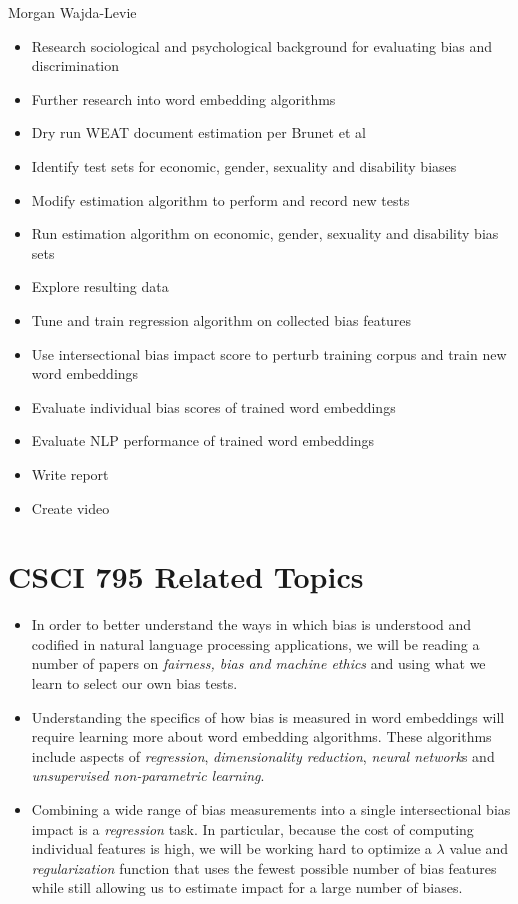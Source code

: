 \documentclass{article}
\begin{document}
\vspace{1em}
\noindent
Morgan Wajda-Levie
\begin{itemize}
    \item Research sociological and psychological background for
        evaluating bias and discrimination
    \item Further research into word embedding algorithms
    \item Dry run WEAT document estimation per Brunet et
        al\cite{brunet_understanding_2019}
    \item Identify test sets for economic, gender, sexuality and
        disability biases
    \item Modify estimation algorithm to perform and record new tests
    \item Run estimation algorithm on economic, gender, sexuality and
        disability bias sets
    \item Explore resulting data
    \item Tune and train regression algorithm on collected bias features
    \item Use intersectional bias impact score to perturb training
        corpus and train new word embeddings
    \item Evaluate individual bias scores of trained word embeddings
    \item Evaluate NLP performance of trained word embeddings
    \item Write report
    \item Create video
\end{itemize}

\section{CSCI 795 Related Topics}

\begin{itemize}
    \item In order to better understand the ways in which bias is
        understood and codified in natural language processing
        applications, we will be reading a number of papers on
        \emph{fairness, bias and machine ethics} and using what we learn
        to select our own bias tests.
    \item Understanding the specifics of how bias is measured in word
        embeddings will require learning more about word embedding
        algorithms. These algorithms include aspects of
        \emph{regression}, \emph{dimensionality reduction}, \emph{neural
            network}s and \emph{unsupervised non-parametric learning}.
    \item Combining a wide range of bias measurements into a single
        intersectional bias impact is a \emph{regression} task. In
        particular, because the cost of computing individual features is
        high, we will be working hard to optimize a $\lambda$ value and
        \emph{regularization } function that uses the fewest possible
        number of bias features while still allowing us to estimate
        impact for a large number of biases.
\end{itemize}
\end{document}
